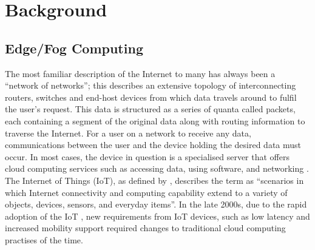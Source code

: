 \documentclass{l4proj}
\begin{document}
%
%
%
%
%

\chapter{Background}

\section{Edge/Fog Computing}
The most familiar description of the Internet to many has always been a ``network of networks''; this describes an extensive topology of interconnecting routers, switches and end-host devices from which data travels around to fulfil the user's request.
This data is structured as a series of quanta called packets, each containing a segment of the original data along with routing information to traverse the Internet.
For a user on a network to receive any data, communications between the user and the device holding the desired data must occur.
In most cases, the device in question is a specialised server that offers cloud computing services such as accessing data, using software, and networking \citep{cloud_computing}.
The Internet of Things (IoT), as defined by \cite{iot}, describes the term as ``scenarios in which Internet connectivity and computing capability extend to a variety of objects, devices, sensors, and everyday items''.
In the late 2000s, due to the rapid adoption of the IoT \citep{iotboom}, new requirements from IoT devices, such as low latency and increased mobility support \citep{fog_computing} required changes to traditional cloud computing practises of the time.
\end{document}
